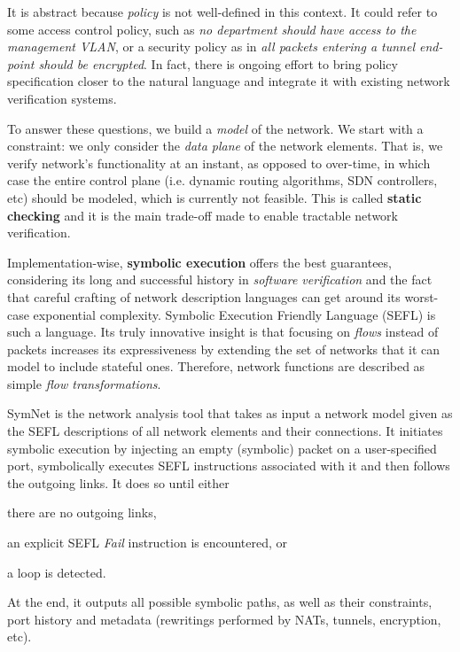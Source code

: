 \documentclass[twoside, 11pt, a4paper]{article}
\begin{document}
It is abstract because \emph{policy} is not well-defined in this context.  It
could refer to some access control policy, such as \emph{no department should
have access to the management VLAN}, or a security policy as in \emph{all
packets entering a tunnel end-point should be encrypted}. In fact, there is
ongoing effort to bring policy specification closer to the natural language and
integrate it with existing network verification systems.

To answer these questions, we build a \emph{model} of the network.  We start
with a constraint: we only consider the \emph{data plane} of the network
elements.  That is, we verify network's functionality at an instant, as opposed
to over-time, in which case the entire control plane (i.e. dynamic routing
algorithms, SDN controllers, etc) should be modeled, which is currently not
feasible. This is called \textbf{static checking} \cite{stoenescu2013symnet}
and it is the main trade-off made to enable tractable network verification.

Implementation-wise, \textbf{symbolic execution} offers the best guarantees,
considering its long and successful history in \emph{software verification}
\cite{cadar2008klee} and the fact that careful crafting of network description
languages can get around its worst-case exponential complexity. Symbolic
Execution Friendly Language (SEFL) \cite{stoenescu2016symnet} is such a
language. Its truly innovative insight is that focusing on \emph{flows} instead
of packets increases its expressiveness by extending the set of networks that
it can model to include stateful ones. Therefore, network functions are
described as simple \emph{flow transformations}.

SymNet is the network analysis tool that takes as input a network model given
as the SEFL descriptions of all network elements and their connections. It
initiates symbolic execution by injecting an empty (symbolic) packet on a
user-specified port, symbolically executes SEFL instructions associated with it
and then follows the outgoing links.  It does so until either
\begin{inparaenum}[i)]
  \item there are no outgoing links,
  \item an explicit SEFL \emph{Fail} instruction is encountered, or
  \item a loop is detected.
\end{inparaenum}
At the end, it outputs all possible symbolic paths, as well as their
constraints, port history and metadata (rewritings performed by NATs, tunnels,
encryption, etc).
\end{document}
